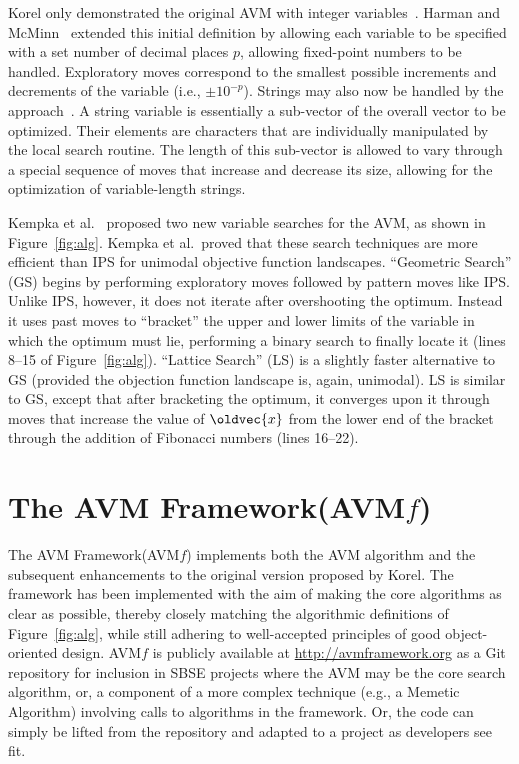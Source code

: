 \documentclass{llncs}
\let\vec\oldvec %
\newcommand{\longname}{AVM Framework\xspace}
\newcommand{\name}{\mbox{AVM\hspace{-1pt}$f$}\xspace}
\newcommand{\repourl}{\url{http://avmframework.org}\xspace}
\newcommand{\inlineheading}[1]{\vspace{1mm} \noindent {\bf #1.}}
\begin{document}
\inlineheading{New Representations}
Korel only demonstrated the original AVM with integer variables~\cite{Korel1990}. Harman and McMinn~\cite{Harman2007} extended this initial definition by allowing each variable to be specified with a set number of decimal places $p$, allowing fixed-point numbers to be handled. Exploratory moves correspond to the smallest possible increments and decrements of the variable (i.e., $\pm10^{-p}$). Strings may also now be handled by the approach~\cite{Kapfhammer2013,McMinn2015}. A string variable is essentially a sub-vector of the overall vector to be optimized. Their elements are characters that are individually manipulated by the local search routine. The length of this sub-vector is allowed to vary through a special sequence of moves that increase and decrease its size, allowing for the optimization of variable-length strings.

\inlineheading{New Variable Search Algorithms}
Kempka et al.~\cite{Kempka2013,Kempka2015} proposed two new variable searches for the AVM, as shown in Figure~\ref{fig:alg}. Kempka et al.\ proved that these search techniques are more efficient than IPS for unimodal objective function landscapes. ``Geometric Search'' (GS) begins by performing exploratory moves followed by pattern moves like IPS. Unlike IPS, however, it does not iterate after overshooting the optimum. Instead it uses past moves to  ``bracket'' the upper and lower limits of the variable in which the optimum must lie, performing a binary search to finally locate it (lines 8--15 of Figure~\ref{fig:alg}). ``Lattice Search'' (LS) is a slightly faster alternative to GS (provided the objection function landscape is, again, unimodal). LS is similar to GS, except that after bracketing the optimum, it converges upon it through moves that increase the value of $\vec{x}$ from the lower end of the bracket through the addition of Fibonacci numbers (lines 16--22).

\vspace{-1em}
\section{The \longname (\name)}
\vspace{-1em}
\label{sec:avmf}

The \longname (\name) implements both the AVM algorithm and the subsequent enhancements to the original version proposed by Korel. The framework has been implemented with the aim of making the core algorithms as clear as possible, thereby closely matching the algorithmic definitions of Figure~\ref{fig:alg}, while still adhering to well-accepted principles of good object-oriented design. \name is publicly available at \repourl as a Git repository for inclusion in SBSE projects where the AVM may be the core search algorithm, or, a component of a more complex technique (e.g., a Memetic Algorithm) involving calls to algorithms in the framework. Or, the code can simply be lifted from the repository and adapted to a project as developers see fit.
\end{document}
